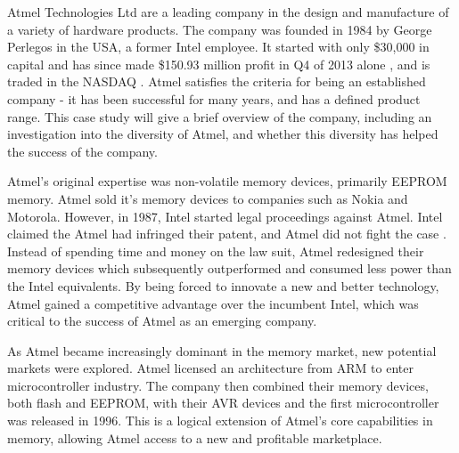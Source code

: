 

Atmel Technologies Ltd are a leading company in the design and manufacture of a variety of hardware products. 
The company was founded in 1984 by George Perlegos in the USA, a former Intel employee. 
It started with only \$30,000 in capital \cite{atmel:capital} and has since made \$150.93 million profit in Q4 of 2013 alone \cite{atmel:profit}, and is traded in the NASDAQ \cite{atmel:nasdaq}.
Atmel satisfies the criteria for being an established company - it has been successful for many years, and has a defined product range.
This case study will give a brief overview of the company, including an investigation into the diversity of Atmel, and whether this diversity has helped the success of the company.



Atmel's original expertise was non-volatile memory devices, primarily EEPROM memory.
Atmel sold it's memory devices to companies such as Nokia and Motorola.
However, in 1987, Intel started legal proceedings against Atmel.
Intel claimed the Atmel had infringed their patent, and Atmel did not fight the case \cite{atmel:intel}.
Instead of spending time and money on the law suit, Atmel redesigned their memory devices which subsequently outperformed and consumed less power than the Intel equivalents.
By being forced to innovate a new and better technology, Atmel gained a competitive advantage over the incumbent Intel, which was critical to the success of Atmel as an emerging company.


As Atmel became increasingly dominant in the memory market, new potential markets were explored.
Atmel licensed an architecture from ARM to enter microcontroller industry.
The company then combined their memory devices, both flash and EEPROM, with their AVR devices and the first microcontroller was released in 1996.
This is a logical extension of Atmel's core capabilities in memory, allowing Atmel access to a new and profitable marketplace.


